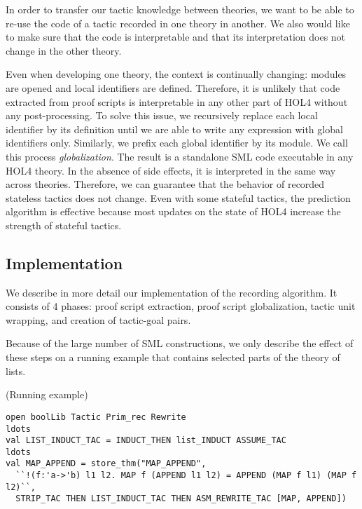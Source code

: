 \documentclass[runningheads,a4paper,draft]{svjour3}
\def\holfour{\textsf{HOL4}\xspace}
\def\sml{\textsf{SML}\xspace}
\begin{document}
In order to transfer our tactic knowledge between theories, we want to be able
to re-use the code of a tactic recorded in one theory in another. 
We also would like to make sure that the code is interpretable and that
its interpretation does not change in the other theory.

Even when developing one theory, the context is continually changing:
modules are opened and local identifiers are defined. Therefore, it is unlikely
that code extracted from proof scripts is interpretable in any other part of
\holfour without any post-processing.
To solve this issue, we recursively replace each local identifier by its
definition until we are able to write any expression with global identifiers
only. Similarly, we prefix each global identifier by its module.
We call this process \emph{globalization}. The result is a standalone \sml code
executable in any \holfour theory.  In the absence of side effects, it is
interpreted in the same way across theories.
Therefore, we can guarantee that the behavior of recorded stateless tactics
does not change. Even with some stateful tactics, the prediction algorithm is  
effective because most updates on the state of \holfour increase the 
strength of stateful tactics.

\subsection{Implementation}
We describe in more detail our implementation of the recording algorithm. It
consists of 4 phases: proof script extraction, proof script globalization,
tactic unit wrapping, and creation of tactic-goal pairs.

Because of the large number of \sml constructions, we only describe the effect
of these steps on a running example that contains selected parts of the theory
of lists.


\begin{example}\label{ex:running}(Running example)
\small
\begin{lstlisting}[language=SMLSmall]
open boolLib Tactic Prim_rec Rewrite
ldots
val LIST_INDUCT_TAC = INDUCT_THEN list_INDUCT ASSUME_TAC
ldots
val MAP_APPEND = store_thm("MAP_APPEND",
  ``!(f:'a->'b) l1 l2. MAP f (APPEND l1 l2) = APPEND (MAP f l1) (MAP f l2)``,
  STRIP_TAC THEN LIST_INDUCT_TAC THEN ASM_REWRITE_TAC [MAP, APPEND])
\end{lstlisting}
\end{example}
\end{document}
